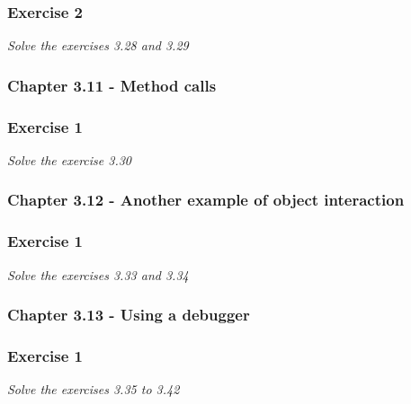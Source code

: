 \subsubsection*{Exercise 2}
\textit{Solve the exercises 3.28 and 3.29}\\

\subsubsection{Chapter 3.11 - Method calls}

\subsubsection*{Exercise 1}
\textit{Solve the exercise 3.30}\\

\subsubsection{Chapter 3.12 - Another example of object interaction}

\subsubsection*{Exercise 1}
\textit{Solve the exercises 3.33 and 3.34}\\

\subsubsection{Chapter 3.13 - Using a debugger}

\subsubsection*{Exercise 1}
\textit{Solve the exercises 3.35 to 3.42}\\

